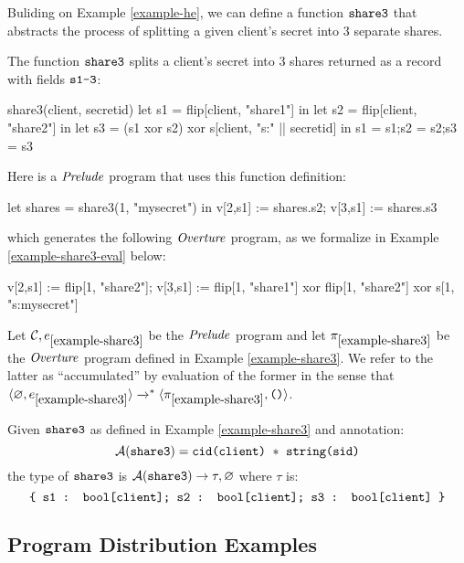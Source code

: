 Buliding on Example \ref{example-he}, we can define a function
$\texttt{share3}$ that abstracts the process of splitting a given
client's secret into 3 separate shares.
\begin{example} \label{example-share3} The function $\texttt{share3}$ 
  splits a client's secret into 3 shares returned as a record
  with fields $\texttt{s1-3}$:
  {\small
  \begin{verbatimtab}
      share3(client, secretid) {
        let s1 = flip[client, "share1"] in
        let s2 = flip[client, "share2"] in
        let s3 = (s1 xor s2) xor s[client, "s:" || secretid] in
        {s1 = s1;s2 = s2;s3 = s3}
      } \end{verbatimtab}
  }
  Here is a $\mathit{Prelude}$ program that uses this function definition:
  {\small
    \begin{verbatimtab}
      let shares = share3(1, "mysecret") in
      v[2,s1] := shares.s2;
      v[3,s1] := shares.s3 \end{verbatimtab}
  }
  which generates the following $\mathit{Overture}$ program, as we formalize in Example \ref{example-share3-eval}
  below:
  {\small
  \begin{verbatimtab}
      v[2,s1] := flip[1, "share2"];
      v[3,s1] := flip[1, "share1"] xor flip[1, "share2"] xor s[1, "s:mysecret"] \end{verbatimtab}
  }
\end{example}

\begin{example}
  \label{example-share3-eval}
  Let $\mathcal{C},e_{\ref{example-share3}}$ be the $\mathit{Prelude}$ program and let 
  $\pi_{\ref{example-share3}}$ be the  $\mathit{Overture}$ program defined
  in Example \ref{example-share3}. We refer to the latter as ``accumulated''
  by evaluation of the former in the sense that $\langle \varnothing,e_{\ref{example-share3}} \rangle
  \xrightarrow{}^{*} \langle \pi_{\ref{example-share3}},\texttt{()} \rangle$.
\end{example}

\begin{example}
  Given $\texttt{share3}$ as defined in Example \ref{example-share3} and
  annotation:
  $$\tas(\ttt{share3}) =  \ttt{cid(client)}\ *\ \ttt{string(sid)}$$
  the type of $\texttt{share3}$ is $\mathcal{A}(\texttt{share3}) \rightarrow \tau,\varnothing$
  where $\tau$ is:
  $$
  \texttt{\{ s1 : bool[client]; s2 : bool[client]; s3 : bool[client] \}}
  $$
\end{example}

\subsection{Program Distribution Examples}
\label{section-examples-progd}
\label{section-pmf-examples}

